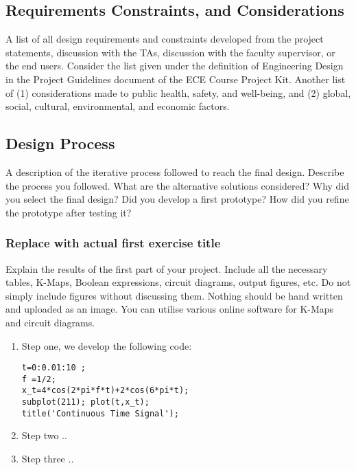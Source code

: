 \subsection{Requirements Constraints, and  Considerations}

A list of all design requirements and constraints developed from the project statements, discussion with the TAs, discussion with the faculty supervisor, or the end users. Consider the list given under the definition of Engineering Design in the Project Guidelines document of the ECE Course Project Kit. 
Another list of (1) considerations made to public health, safety, and well-being, and (2) global, social, cultural, environmental, and economic factors.

\subsection{Design Process}
A description of the iterative process followed to reach the final design. Describe the process you followed. What are the alternative solutions considered? Why did you select the final design? Did you develop a first prototype? How did you refine the prototype after testing it? 

\subsubsection{Replace with actual first exercise title}
Explain the results of the first part of your project. Include all the necessary tables, K-Maps, Boolean expressions, circuit diagrams, output figures, etc. Do not simply include figures without discussing them. Nothing should be hand written and uploaded as an image. You can utilise various online software for K-Maps and circuit diagrams.
\\

\begin{enumerate}
\item Step one, we develop the following code: 

\begin{lstlisting}
t=0:0.01:10 ; 
f =1/2; 
x_t=4*cos(2*pi*f*t)+2*cos(6*pi*t);
subplot(211); plot(t,x_t);
title('Continuous Time Signal');
\end{lstlisting}

\item Step two .. 
\item Step three .. 
\end{enumerate}


